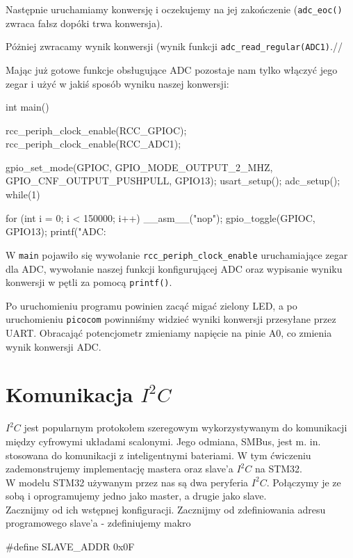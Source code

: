 \documentclass{pdfBooklets}
\begin{document}
Następnie uruchamiamy konwersję i oczekujemy na jej zakończenie (\Verb$adc_eoc()$ zwraca fałsz dopóki trwa konwersja).

Póżniej zwracamy wynik konwersji (wynik funkcji \Verb$adc_read_regular(ADC1)$.//

Mając już gotowe funkcje obsługujące ADC pozostaje nam tylko włączyć jego zegar i użyć w jakiś sposób wyniku naszej konwersji:

\begin{CodeFrame*}[c]{}
int main(){
  rcc_periph_clock_enable(RCC_GPIOC);
  rcc_periph_clock_enable(RCC_ADC1);
  
  gpio_set_mode(GPIOC, GPIO_MODE_OUTPUT_2_MHZ,
		GPIO_CNF_OUTPUT_PUSHPULL, GPIO13);
  usart_setup();
  adc_setup();
  while(1){
    for (int i = 0; i < 150000; i++) __asm__("nop");
    gpio_toggle(GPIOC, GPIO13);
    printf("ADC: %
    
  }
}
\end{CodeFrame*}

W \Verb$main$ pojawiło się wywołanie \Verb$rcc_periph_clock_enable$ uruchamiające zegar dla ADC, wywołanie naszej funkcji
konfigurującej ADC oraz wypisanie wyniku konwersji w pętli za pomocą \Verb$printf()$.

Po uruchomieniu programu powinien zacąć migać zielony LED, a po uruchomieniu \Verb$picocom$ powinniśmy widzieć wyniki konwersji
przesyłane przez UART. Obracająć potencjometr zmieniamy napięcie na pinie A0, co zmienia wynik konwersji ADC.


\section{Komunikacja $I^2C$}
$I^2C$ jest popularnym protokołem szeregowym wykorzystywanym do komunikacji między cyfrowymi układami scalonymi. Jego odmiana, SMBus, jest m. in.
stosowana do komunikacji z inteligentnymi bateriami. W tym ćwiczeniu zademonstrujemy implementację mastera oraz slave'a $I^2C$ na STM32.\\

W modelu STM32 używanym przez nas są dwa peryferia $I^2C$. Połączymy je ze sobą i oprogramujemy jedno jako master, a drugie jako slave.\\
Zacznijmy od ich wstępnej konfiguracji. Zacznijmy od zdefiniowania adresu programowego slave'a - zdefiniujemy makro
\begin{CodeFrame*}[c]{}
#define SLAVE_ADDR 0x0F
\end{CodeFrame*}
\end{document}
